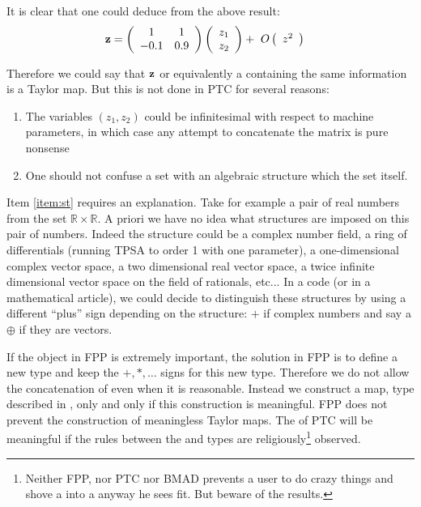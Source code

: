 \documentclass[english,12pt,article]{article} %
\begin{document}
{It is clear that one could deduce from the above result:
%
\begin{align} {\bf z}&=\left({\begin{array}{cc}1&1\\
-0.1&0.9\end{array}}\right)\left({\begin{array}{c} {z}_{1} \cr {z}_{2} \end{array}}\right)+\ O\left({\begin{array}{c}{z}^{2}\end{array}}\right) \label{eq:lin1}\end{align}

Therefore we could say that ${\bf z}$ or equivalently a  containing the same information is a Taylor map. But this is not done in PTC for several reasons:

\begin{enumerate}
\item The variables  $(z_1,z_2)$ could  be  infinitesimal with respect to machine parameters, in which case any attempt to concatenate the matrix is pure nonsense 
\item\label{item:st}  One should not confuse a set with an algebraic structure which  the  set itself.
\end{enumerate}

Item \ref{item:st} requires an explanation. Take for example  a pair of real numbers from the set  $\mathbb{R} \times \mathbb{R}$.  A priori we have no idea what structures are imposed on this pair of numbers. Indeed the structure could be    a complex number field, a ring of differentials (running TPSA to order 1 with one parameter),  a one-dimensional complex vector space, a two dimensional real vector space, a twice infinite dimensional  vector space on the field of rationals, etc... In a code (or in a mathematical article), we could decide to  distinguish these structures by using a different ``plus'' sign depending on the structure: $+$ if complex numbers and say a $\oplus$ if they are vectors. 

If the object in FPP is extremely important, the solution in FPP is to define  a new type and  keep the $+,*,\ldots $ signs for this new type.  Therefore we do not allow the concatenation of  even when it is reasonable. Instead we construct a map, type  described in , only and only if this construction is meaningful.  FPP does not prevent the construction of meaningless Taylor maps. The   of PTC will be meaningful if the rules between the  and   types are religiously\footnote{Neither FPP, nor PTC nor  BMAD prevents  a user to do crazy things and shove a   into a   anyway he sees fit. But beware of the results.}  observed.  

}
\end{document}

